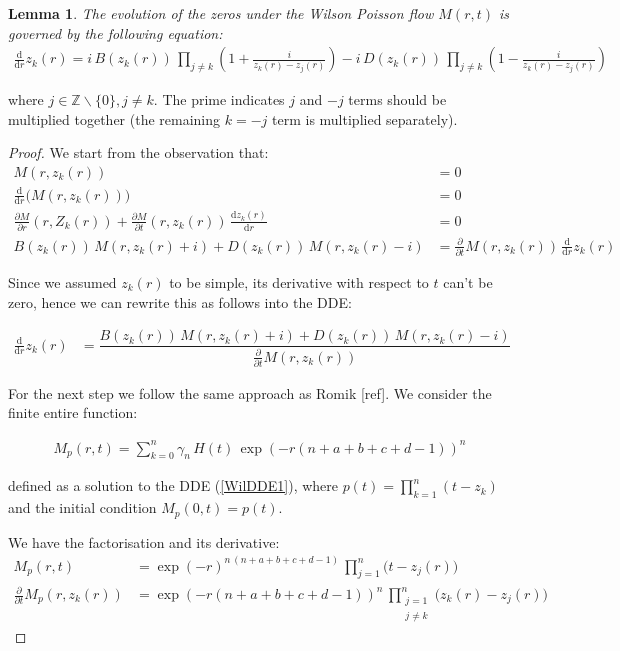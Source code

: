\documentclass[a4paper,11pt,twoside]{amsart}
\newtheorem{lemma}[theorem]{Lemma}
\begin{document}
\begin{lemma}\label{proofWil2} The evolution of the zeros under the Wilson Poisson flow $M(r,t)$ is governed by the following equation:
\begin{align}
 \frac{\mathrm{d}}{\mathrm{d} r}z_k(r) = i\,B(z_k(r))\, \prod_{j \ne k}\left(1+ \frac{i}{z_k(r)-z_j(r)}\right) -i\,D(z_k(r))\,\prod_{j \ne k} \left(1-\frac{i}{z_k(r)-z_j(r)}\right)
\end{align}
\end{lemma}
where $j \in \mathbb{Z}\backslash\{0\}, j \ne k$. The prime indicates $j$ and $-j$ terms should be multiplied together (the remaining $k=-j$ term is multiplied separately).
\begin{proof}
We start from the observation that:
\begin{align}
M(r,z_k(r)) &= 0 \\
\frac{\mathrm{d}}{\mathrm{d} r} \big(M(r,z_k(r))\big) &= 0 \\
\frac{\partial M}{\partial r}(r,Z_k(r))+ \frac{\partial M}{\partial t}(r,z_k(r))\,\frac{\mathrm{d} z_k(r)}{\mathrm{d} r} &= 0 \\
B(z_k(r))\,M(r,z_k(r)+i) + D(z_k(r))\,M(r,z_k(r)-i)  &= \frac{\partial}{\partial t}M(r,z_k(r))\,\frac{\mathrm{d}}{\mathrm{d} r}z_k(r)
\end{align}

Since we assumed $z_k(r)$ to be simple, its derivative with respect to $t$ can't be zero, hence we can rewrite this as follows into the DDE:

\begin{align} \label{WilDDE1}
\frac{\mathrm{d} }{\mathrm{d} r}z_k(r) &= \dfrac{B(z_k(r))\,M(r,z_k(r)+i) + D(z_k(r))\,M(r,z_k(r)-i)}{ \frac{\partial}{\partial t}M(r,z_k(r))}
\end{align}

For the next step we follow the same approach as Romik [ref]. We consider the finite entire function:

\begin{align}
M_p(r,t) = \sum_{k=0}^n \gamma_n \, H(t)\,\exp(-r(n+a+b+c+d-1))^{n} 
\end{align}

defined as a solution to the DDE (\ref{WilDDE1}), where $p(t)= \prod_{k=1}^n(t-z_k)$ and the initial condition $M_p(0,t)=p(t)$. 

We have the factorisation and its derivative: 
\begin{align}
M_p(r,t) &= \exp(-r)^{n\,(n+a+b+c+d-1)}\,\prod_{j=1}^n\bigg(t-z_j(r)\bigg)\\
\frac{\partial}{\partial t} M_p(r,z_k(r)) &= \exp\left(-r(n+a+b+c+d-1)\right)^{n}\,\prod^n_{\substack{j=1\\j\ne k}}\bigg(z_k(r)-z_j(r)\bigg)
\end{align}


\end{proof}
\end{document}
